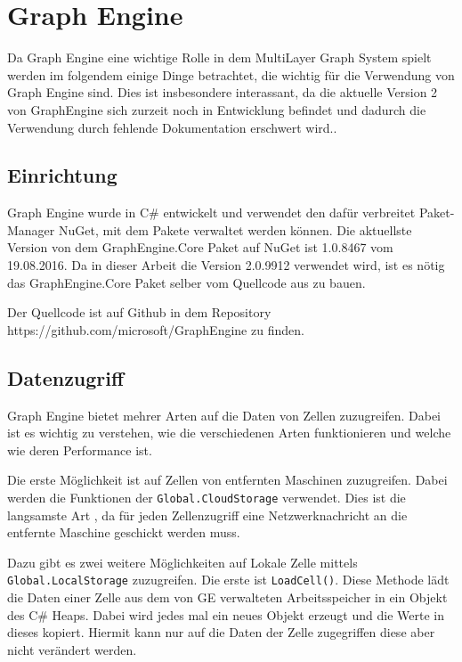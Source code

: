 \section{Graph Engine}

Da Graph Engine eine wichtige Rolle in dem MultiLayer Graph System spielt werden im folgendem einige Dinge betrachtet, die wichtig für die Verwendung von Graph Engine sind.
Dies ist insbesondere interassant, da die aktuelle Version 2 von GraphEngine sich zurzeit noch in Entwicklung befindet und dadurch die Verwendung durch fehlende Dokumentation erschwert wird..


\subsection{Einrichtung}

Graph Engine wurde in C\# entwickelt und verwendet den dafür verbreitet Paket-Manager NuGet, mit dem Pakete verwaltet werden können.
Die aktuellste Version von dem GraphEngine.Core Paket auf NuGet ist 1.0.8467 vom 	19.08.2016. Da in dieser Arbeit die Version 2.0.9912 verwendet wird, ist es nötig das GraphEngine.Core Paket selber vom Quellcode aus zu bauen.

Der Quellcode ist auf Github in dem Repository https://github.com/microsoft/GraphEngine zu finden. 


\subsection{Datenzugriff}


Graph Engine bietet mehrer Arten auf die Daten von Zellen zuzugreifen. Dabei ist es wichtig zu verstehen, wie die verschiedenen Arten funktionieren und welche wie deren Performance ist.

Die erste Möglichkeit ist auf Zellen von entfernten Maschinen zuzugreifen. Dabei werden die Funktionen der \verb|Global.CloudStorage| verwendet. Dies ist die langsamste Art , da für jeden Zellenzugriff eine Netzwerknachricht an die entfernte Maschine geschickt werden muss.

Dazu gibt es zwei weitere Möglichkeiten auf Lokale Zelle mittels \verb|Global.LocalStorage| zuzugreifen. Die erste ist \verb|LoadCell()|. Diese Methode lädt die Daten einer Zelle aus dem von GE verwalteten Arbeitsspeicher in ein Objekt des C\# Heaps.
Dabei wird jedes mal ein neues Objekt erzeugt und die Werte in dieses kopiert. Hiermit kann nur auf die Daten der Zelle zugegriffen diese aber nicht verändert werden.


